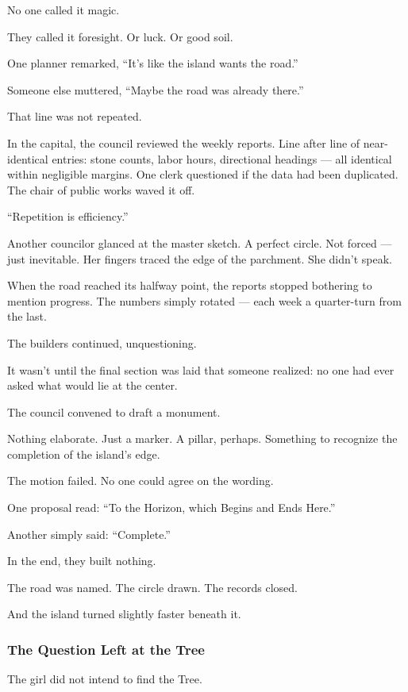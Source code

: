 \documentclass[12pt]{article}
\begin{document}
No one called it magic.

They called it foresight. Or luck. Or good soil.

One planner remarked, ``It’s like the island wants the road.''

Someone else muttered, ``Maybe the road was already there.''

That line was not repeated.

In the capital, the council reviewed the weekly reports. Line after line of near-identical entries: stone counts, labor hours, directional headings — all identical within negligible margins. One clerk questioned if the data had been duplicated. The chair of public works waved it off.

``Repetition is efficiency.''

Another councilor glanced at the master sketch. A perfect circle. Not forced — just inevitable. Her fingers traced the edge of the parchment. She didn’t speak.

When the road reached its halfway point, the reports stopped bothering to mention progress. The numbers simply rotated — each week a quarter-turn from the last.

The builders continued, unquestioning.

It wasn’t until the final section was laid that someone realized: no one had ever asked what would lie at the center.

The council convened to draft a monument.

Nothing elaborate. Just a marker. A pillar, perhaps. Something to recognize the completion of the island’s edge.

The motion failed. No one could agree on the wording.

One proposal read: ``To the Horizon, which Begins and Ends Here.''

Another simply said: ``Complete.''

In the end, they built nothing.

The road was named. The circle drawn. The records closed.

And the island turned slightly faster beneath it.


\dotfill

\subsubsection{The Question Left at the Tree}

The girl did not intend to find the Tree.
\end{document}
